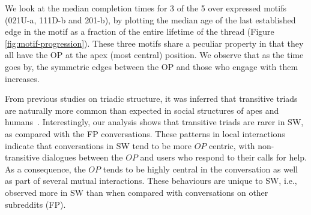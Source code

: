 We look at the median completion times for 3 of the 5 over expressed motifs (021U-a, 111D-b and 201-b), by plotting the median age of the last established edge in the motif as a fraction of the entire lifetime of the thread (Figure \ref{fig:motif-progression}). These three motifs share a peculiar property in that they all have the OP at the apex (most central) position. We observe that as the time goes by, the symmetric edges between the OP and those who engage with them increases.  

From previous studies on triadic structure, it was inferred that transitive triads are naturally more common than expected in social structures of apes and humans~\cite{shizuka2015network}. Interestingly, our analysis shows that transitive triads are rarer in SW, as compared with the FP conversations. 
These patterns in local interactions indicate that conversations in SW tend to be more $OP$ centric, with non-transitive dialogues between the $OP$ and users who respond to their calls for help. As a consequence, the $OP$ tends to be highly central in the conversation as well as part of several mutual interactions. These behaviours are unique to SW, i.e., observed more in SW than when compared with conversations on other subreddits (FP).  


